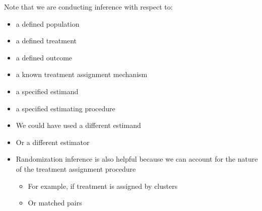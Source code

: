 \documentclass[xcolor={dvipsnames},handout]{beamer}
\begin{document}
%
%
%
%
%
\begin{frame}

Note that we are conducting inference with respect to:

\begin{itemize}
\item a defined population
\item a defined treatment
\item a defined outcome
\item a known treatment assignment mechanism
\item a specified estimand
\item a specified estimating procedure
\end{itemize}

\end{frame}




\begin{frame}{}

\begin{itemize}
\item We could have used a different estimand
\item Or a different estimator
\item Randomization inference is also helpful because we can account for the nature of the treatment assignment procedure
\begin{itemize}
\item For example, if treatment is assigned by clusters
\item Or matched pairs
\end{itemize}
\end{itemize}

\end{frame}
\end{document}
